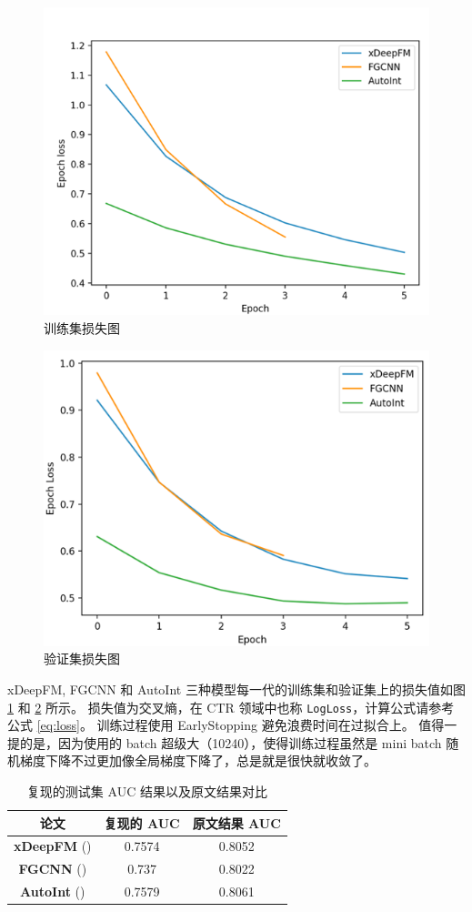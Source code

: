\documentclass[degree=project,degree-type=project,cjk-font=noto]{thuthesis}
\begin{document}
\begin{figure}[h]
\centering%
\includegraphics[width=.7\linewidth]{train_loss_ctr}
  \caption{训练集损失图}
  \label{fig:train_loss}
\end{figure}

\begin{figure}[h]
\centering%
\includegraphics[width=.7\linewidth]{val_loss_ctr}
  \caption{验证集损失图}
  \label{fig:val_loss}
\end{figure}

xDeepFM, FGCNN 和 AutoInt 三种模型每一代的训练集和验证集上的损失值如图 \ref{fig:train_loss} 和 \ref{fig:val_loss} 所示。
损失值为交叉熵，在 CTR 领域中也称 \texttt{LogLoss}，计算公式请参考公式 \ref{eq:loss}。
训练过程使用 EarlyStopping 避免浪费时间在过拟合上。
值得一提的是，因为使用的 batch 超级大（10240），使得训练过程虽然是 mini batch 随机梯度下降不过更加像全局梯度下降了，总是就是很快就收敛了。

\begin{table}[htb]
  \centering
  \caption{复现的测试集 AUC 结果以及原文结果对比}
  \label{tab:reproduce_auc}
  \begin{tabular}{ccc}
    \toprule
    \textbf{论文}         & \textbf{复现的 AUC}           & \textbf{原文结果 AUC}            \\
    \midrule
    \textbf{xDeepFM} (\cite{xdeepfm}) & 0.7574 & 0.8052 \\
    \textbf{FGCNN} (\cite{fgcnn})           & 0.737           & 0.8022  \\
    \textbf{AutoInt} (\cite{autoint})         & 0.7579           & 0.8061 \\
    \bottomrule
  \end{tabular}
\end{table}
\end{document}
